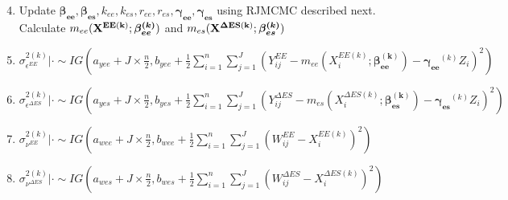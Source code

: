 \documentclass[handout]{beamer}\usepackage[]{graphicx}\usepackage[]{color}
\begin{document}
\begin{frame}

\begin{enumerate}
\setcounter{enumi}{3}
\item
Update ${\boldsymbol{\beta_{ee}},\boldsymbol{\beta_{es}}},k_{ee},k_{es}, {  r_{ee}, r_{es}}, \boldsymbol{\gamma_{ee}^{}}, \boldsymbol{\gamma_{es}^{}}$ using RJMCMC described next. Calculate $m_{ee}({\bf X^{EE(k)}};\boldsymbol{\beta_{ee}^{(k)}})$ and $m_{es}({\bf X^{\Delta ES(k)}};\boldsymbol{\beta_{es}^{(k)}})$ \\

\vspace{0.2cm}

\item
 $\sigma^{2(k)}_{\epsilon^{EE}} |\cdot \sim IG(a_{yee}+J\times \frac{n}{2},b_{yee}+\frac{1}{2}\sum_{i=1}^{n}\sum_{j=1}^{J}(Y_{ij}^{EE}-m_{ee}(X_i^{EE(k)};\boldsymbol{\beta_{ee}^{(k)}})-\boldsymbol{\gamma_{ee}}^{(k)}Z_i)^2)$ \\
 
\vspace{0.2cm}

\item
 $\sigma^{2(k)}_{\epsilon^{\Delta ES}} |\cdot \sim IG(a_{yes}+J\times \frac{n}{2},b_{yes}+\frac{1}{2}\sum_{i=1}^{n}\sum_{j=1}^{J}(Y_{ij}^{\Delta ES}-m_{es}(X_i^{\Delta ES(k)};\boldsymbol{\beta_{es}^{(k)}})-\boldsymbol{\gamma_{es}}^{(k)}Z_i)^2)$ \\
 
 \vspace{0.2cm}
 
\item
 $\sigma^{2(k)}_{\nu^{EE}} |\cdot \sim IG(a_{wee}+J\times \frac{n}{2},b_{wee}+\frac{1}{2}\sum_{i=1}^{n}\sum_{j=1}^{J}(W_{ij}^{EE}-X_i^{EE(k)})^2)$ \\
 
 \vspace{0.2cm}
 
\item
 $\sigma^{2(k)}_{\nu^{\Delta ES}} |\cdot \sim IG(a_{wes}+J\times \frac{n}{2},b_{wes}+\frac{1}{2}\sum_{i=1}^{n}\sum_{j=1}^{J}(W_{ij}^{\Delta ES}-X_i^{\Delta ES(k)})^2)$ \\
 
 \end{enumerate}


\end{frame}
\end{document}
